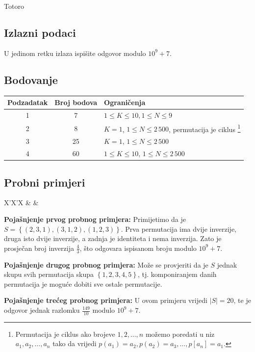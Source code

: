 \begin{statement}[
  problempoints=100,
  timelimit=1 sekunda,
  memorylimit=512 MiB,
]{Totoro}
\subsection*{Izlazni podaci}
U jedinom retku izlaza ispišite odgovor modulo $10^9 + 7$. 

\subsection*{Bodovanje}
{\renewcommand{\arraystretch}{1.4}
  \setlength{\tabcolsep}{6pt}
  \begin{tabular}{ccl}
 Podzadatak & Broj bodova & Ograničenja \\ \midrule
  1 & 7 & $ 1 \le K \le 10, 1 \le N \le 9$ \\
  2 & 8 & $ K = 1 $, $1 \le N \le 2\,500$, permutacija je ciklus 
    \footnote{Permutacija je ciklus ako brojeve $1, 2, \ldots, n$
    možemo poredati u niz $a_1, a_2, \ldots, a_n$ tako da vrijedi
    $p(a_1) = a_2, p(a_2) = a_3, \ldots, p[a_n] = a_1$.} \\
  3 & 25 & $ K = 1$, $1 \le N \le 2\,500$ \\
  4 & 60 & $1 \le K \le 10$, $1 \le N \le 2\,500$ \\
\end{tabular}}
\clearpage
\subsection*{Probni primjeri}
\begin{tabularx}{\textwidth}{X'X'X}
 &
 &
\end{tabularx}

\textbf{Pojašnjenje prvog probnog primjera:}
Primijetimo da je $S = \left\{ (2, 3, 1), (3, 1, 2), (1, 2, 3)\right\}$.
Prva permutacija ima dvije inverzije, druga isto dvije inverzije, a zadnja
je identiteta i nema inverzija. Zato je prosječan broj inverzija $\frac{4}{3}$,
što odgovara ispisanom broju modulo $10^9 + 7$.

\textbf{Pojašnjenje drugog probnog primjera:}
Može se provjeriti da je $S$ jednak skupu svih permutacija skupa 
$\left\{1, 2, 3, 4, 5 \right\}$, tj. komponiranjem danih permutacija
je moguće dobiti sve ostale permutacije.

\textbf{Pojašnjenje trećeg probnog primjera:}
U ovom primjeru vrijedi $|S| = 20$, te je odgovor jednak 
razlomku $\frac{149}{10}$ modulo $10^9 + 7$.

\end{statement}

